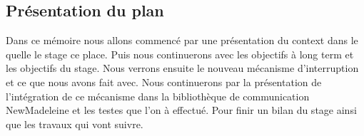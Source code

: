 \subsection{Présentation du plan}

Dans ce mémoire nous allons commencé par une présentation du context dans le quelle le stage ce place.
Puis nous continuerons avec les objectifs à long term et les objectifs du stage.
Nous verrons ensuite le nouveau mécanisme d'interruption et ce que nous avons fait avec.
Nous continuerons par la présentation de l'intégration de ce mécanisme dans la bibliothèque de communication NewMadeleine et les testes que l'on à effectué.
Pour finir un bilan du stage ainsi que les travaux qui vont suivre.

